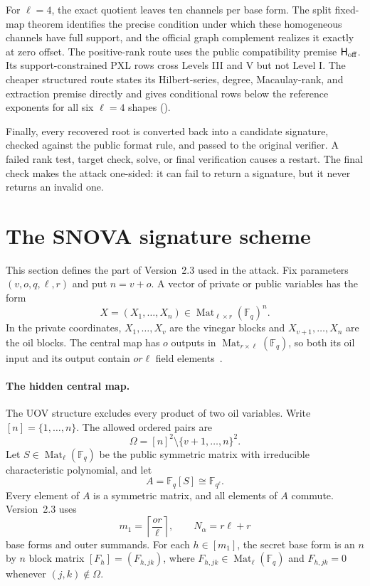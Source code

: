 \documentclass[11pt]{article}
\newcommand{\F}{\mathbb F}
\newcommand{\Mat}{\operatorname{Mat}}
\newcommand{\SNOVA}{\textsf{SNOVA}}
\begin{document}
For $\ell=4$, the exact quotient leaves ten channels per base form.  The
split fixed-map theorem identifies the precise condition under which these
homogeneous channels have full support, and the official graph complement
realizes it exactly at zero offset.  The positive-rank route uses the public
compatibility premise $\mathsf H_{\rm off}$.  Its support-constrained PXL
rows cross Levels III and V but not Level I.  The cheaper structured route
states its Hilbert-series, degree, Macaulay-rank, and extraction premise
directly and gives conditional rows below the reference exponents for all
six $\ell=4$ shapes ().

Finally, every recovered root is converted back into a candidate signature,
checked against the public format rule, and passed to the original verifier.
A failed rank test, target check, solve, or final verification causes a
restart.  The final check makes the attack one-sided: it can fail to return a
signature, but it never returns an invalid one.

\section{The \SNOVA{} signature scheme}\label{sec:scheme}

This section defines the part of Version~2.3 used in the attack.  Fix
parameters $(v,o,q,\ell,r)$ and put $n=v+o$.  A vector of private or public
variables has the form
\[
 X=(X_1,\ldots,X_n)\in\Mat_{\ell\times r}(\F_q)^n.
\]
In the private coordinates, $X_1,\ldots,X_v$ are the vinegar blocks and
$X_{v+1},\ldots,X_n$ are the oil blocks.  The central map has $o$ outputs in
$\Mat_{r\times\ell}(\F_q)$, so both its oil input and its output contain
$or\ell$ field elements~\cite{KipnisPatarinGoubin1999,SNOVA23}.

\paragraph{The hidden central map.}
The UOV structure excludes every product of two oil variables.  Write
$[n]=\{1,\ldots,n\}$.  The allowed ordered pairs are
\begin{equation}
 \Omega=[n]^2\setminus\{v+1,\ldots,n\}^2.
 \label{eq:scheme-omega}
\end{equation}
Let $S\in\Mat_\ell(\F_q)$ be the public symmetric matrix with irreducible
characteristic polynomial, and let
\[
 A=\F_q[S]\cong\F_{q^\ell}.
\]
Every element of $A$ is a symmetric matrix, and all elements of $A$ commute.
Version~2.3 uses
\[
 m_1=\left\lceil\frac{or}{\ell}\right\rceil,
 \qquad N_\alpha=r\ell+r
\]
base forms and outer summands.  For each $h\in[m_1]$, the secret base form is
an $n$ by $n$ block matrix $[F_h]=(F_{h,jk})$, where
$F_{h,jk}\in\Mat_\ell(\F_q)$ and $F_{h,jk}=0$ whenever
$(j,k)\notin\Omega$.
\end{document}
